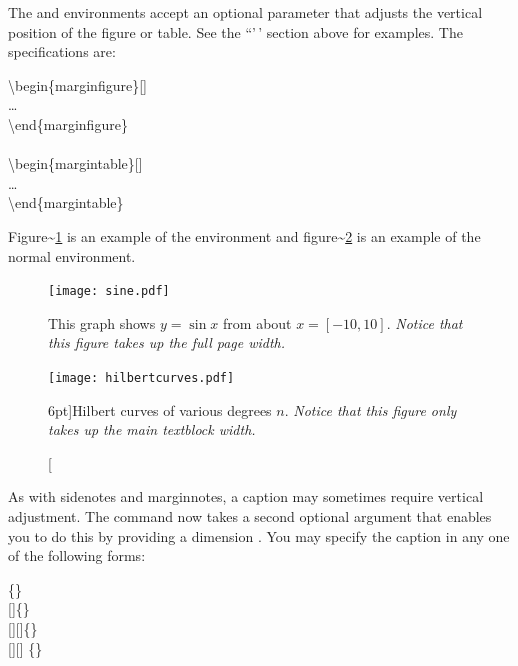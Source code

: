 \documentclass[
  letterpaper,
  DIV=11,
  numbers=noendperiod]{scrartcl}
\begin{document}
The  and  environments accept
an optional parameter  that adjusts the vertical position
of the figure or table. See the ``'\,' section
above for examples. The specifications are:

\begin{docspec}
  \textbackslash{begin\{marginfigure\}[]}\\
  \qquad\ldots\\
  \textbackslash{end\{marginfigure\}}\\
  \mbox{}\\
  \textbackslash{begin\{margintable\}[]}\\
  \qquad\ldots\\
  \textbackslash{end\{margintable\}}\\
\end{docspec}

Figure\textasciitilde{}\ref{fig:fullfig} is an example of the
 environment and
figure\textasciitilde{}\ref{fig:textfig} is an example of the normal
 environment.

\begin{figure}[h]
  \texttt{[image: sine.pdf]}%
  \caption{This graph shows $y = \sin x$ from about $x = [-10, 10]$.
  \emph{Notice that this figure takes up the full page width.}}%
  \label{fig:fullfig}%
\end{figure}

\begin{figure}
  \texttt{[image: hilbertcurves.pdf]}
  \caption[Hilbert curves of various degrees $n$.][6pt]{Hilbert curves of various degrees $n$. \emph{Notice that this figure only takes up the main textblock width.}}
  \label{fig:textfig}
\end{figure}

As with sidenotes and marginnotes, a caption may sometimes require
vertical adjustment. The  command now takes a second
optional argument that enables you to do this by providing a dimension
. You may specify the caption in any one of the following
forms:

\begin{docspec}
  \{\}\\
  []\{\}\\
  [][]\{\}\\
  [][]%
                  \{\}
\end{docspec}
\end{document}
